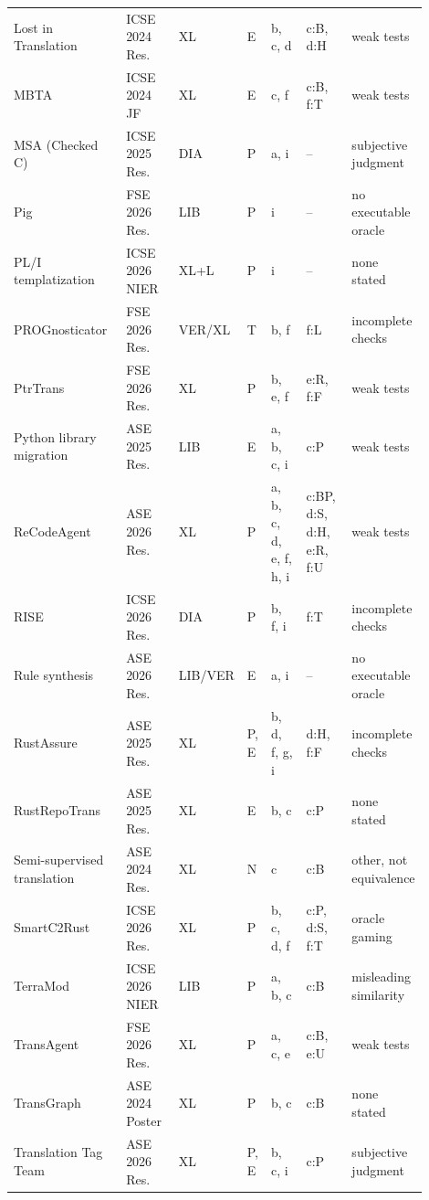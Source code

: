\begin{table}[p]
\begin{tabular}{@{}P{0.22\linewidth} P{0.14\linewidth} P{0.08\linewidth} P{0.05\linewidth} P{0.12\linewidth} P{0.12\linewidth} P{0.17\linewidth}@{}}
    Lost in Translation~\cite{lostintranslation} & ICSE 2024 Res. & XL & E & b, c, d & c:B, d:H & weak tests \\
    MBTA~\cite{mbta} & ICSE 2024 JF & XL & E & c, f & c:B, f:T & weak tests \\
    MSA (Checked C)~\cite{msa} & ICSE 2025 Res. & DIA & P & a, i & -- & subjective judgment \\
    Pig~\cite{pig} & FSE 2026 Res. & LIB & P & i & -- & no executable oracle \\
    PL/I templatization~\cite{pli} & ICSE 2026 NIER & XL+L & P & i & -- & none stated \\
    PROGnosticator~\cite{prognosticator} & FSE 2026 Res. & VER/XL & T & b, f & f:L & incomplete checks \\
    PtrTrans~\cite{ptrtrans} & FSE 2026 Res. & XL & P & b, e, f & e:R, f:F & weak tests \\
    Python library migration~\cite{pylibmig} & ASE 2025 Res. & LIB & E & a, b, c, i & c:P & weak tests \\
    ReCodeAgent~\cite{recodeagent} & ASE 2026 Res. & XL & P & a, b, c, d, e, f, h, i & c:BP, d:S, d:H, e:R, f:U & weak tests \\
    RISE~\cite{rise} & ICSE 2026 Res. & DIA & P & b, f, i & f:T & incomplete checks \\
    Rule synthesis~\cite{rulesynth} & ASE 2026 Res. & LIB/VER & E & a, i & -- & no executable oracle \\
    RustAssure~\cite{rustassure} & ASE 2025 Res. & XL & P, E & b, d, f, g, i & d:H, f:F & incomplete checks \\
    RustRepoTrans~\cite{rustrepotrans} & ASE 2025 Res. & XL & E & b, c & c:P & none stated \\
    Semi-supervised translation~\cite{semisup} & ASE 2024 Res. & XL & N & c & c:B & other, not equivalence \\
    SmartC2Rust~\cite{smartc2rust} & ICSE 2026 Res. & XL & P & b, c, d, f & c:P, d:S, f:T & oracle gaming \\
    TerraMod~\cite{terramod} & ICSE 2026 NIER & LIB & P & a, b, c & c:B & misleading similarity \\
    TransAgent~\cite{transagent} & FSE 2026 Res. & XL & P & a, c, e & c:B, e:U & weak tests \\
    TransGraph~\cite{transgraph} & ASE 2024 Poster & XL & P & b, c & c:B & none stated \\
    Translation Tag Team~\cite{tagteam} & ASE 2026 Res. & XL & P, E & b, c, i & c:P & subjective judgment \\

\end{tabular}
\end{table}
